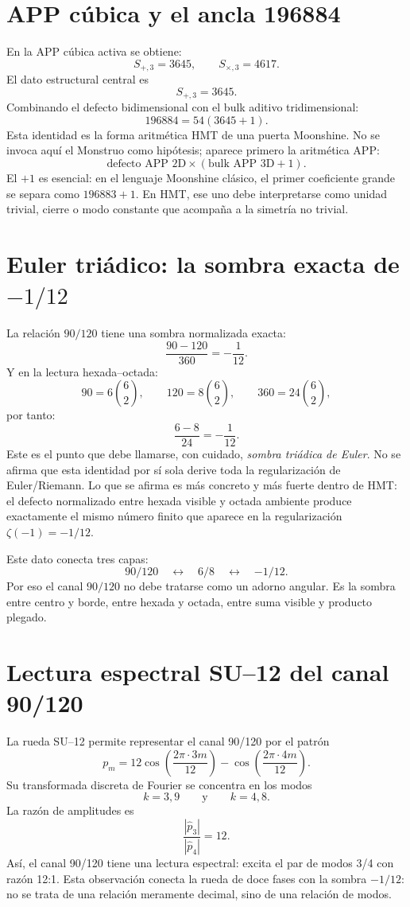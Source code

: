 \documentclass[11pt,a4paper]{article}
\begin{document}
\section{APP c\'ubica y el ancla 196884}
En la APP c\'ubica activa se obtiene:
\[
S_{+,3}=3645,
\qquad
S_{\times,3}=4617.
\]
El dato estructural central es
\[
\boxed{S_{+,3}=3645.}
\]
Combinando el defecto bidimensional con el bulk aditivo tridimensional:
\[
\boxed{196884=54(3645+1).}
\]
Esta identidad es la forma aritm\'etica HMT de una puerta Moonshine. No se invoca aqu\'i el Monstruo como hip\'otesis; aparece primero la aritm\'etica APP:
\[
\text{defecto APP 2D}\times(\text{bulk APP 3D}+1).
\]
El \(+1\) es esencial: en el lenguaje Moonshine cl\'asico, el primer coeficiente grande se separa como \(196883+1\). En HMT, ese uno debe interpretarse como unidad trivial, cierre o modo constante que acompa\~na a la simetr\'ia no trivial.

\section{Euler tri\'adico: la sombra exacta de \(-1/12\)}
La relaci\'on \(90/120\) tiene una sombra normalizada exacta:
\[
\boxed{\frac{90-120}{360}=-\frac{1}{12}.}
\]
Y en la lectura hexada--octada:
\[
90=6\binom{6}{2},
\qquad
120=8\binom{6}{2},
\qquad
360=24\binom{6}{2},
\]
por tanto:
\[
\boxed{\frac{6-8}{24}=-\frac{1}{12}.}
\]
Este es el punto que debe llamarse, con cuidado, \emph{sombra tri\'adica de Euler}. No se afirma que esta identidad por s\'i sola derive toda la regularizaci\'on de Euler/Riemann. Lo que se afirma es m\'as concreto y m\'as fuerte dentro de HMT: el defecto normalizado entre hexada visible y octada ambiente produce exactamente el mismo n\'umero finito que aparece en la regularizaci\'on \(\zeta(-1)=-1/12\).

Este dato conecta tres capas:
\[
\boxed{90/120}\quad\leftrightarrow\quad
\boxed{6/8}\quad\leftrightarrow\quad
\boxed{-1/12}.
\]
Por eso el canal \(90/120\) no debe tratarse como un adorno angular. Es la sombra entre centro y borde, entre hexada y octada, entre suma visible y producto plegado.

\section{Lectura espectral SU--12 del canal 90/120}
La rueda SU--12 permite representar el canal 90/120 por el patr\'on
\[
p_m=12\cos\left(\frac{2\pi\cdot 3m}{12}\right)-\cos\left(\frac{2\pi\cdot4m}{12}\right).
\]
Su transformada discreta de Fourier se concentra en los modos
\[
k=3,9
\qquad\text{y}\qquad
k=4,8.
\]
La raz\'on de amplitudes es
\[
\boxed{\frac{|\widehat p_3|}{|\widehat p_4|}=12.}
\]
As\'i, el canal 90/120 tiene una lectura espectral: excita el par de modos 3/4 con raz\'on 12:1. Esta observaci\'on conecta la rueda de doce fases con la sombra \(-1/12\): no se trata de una relaci\'on meramente decimal, sino de una relaci\'on de modos.
\end{document}
